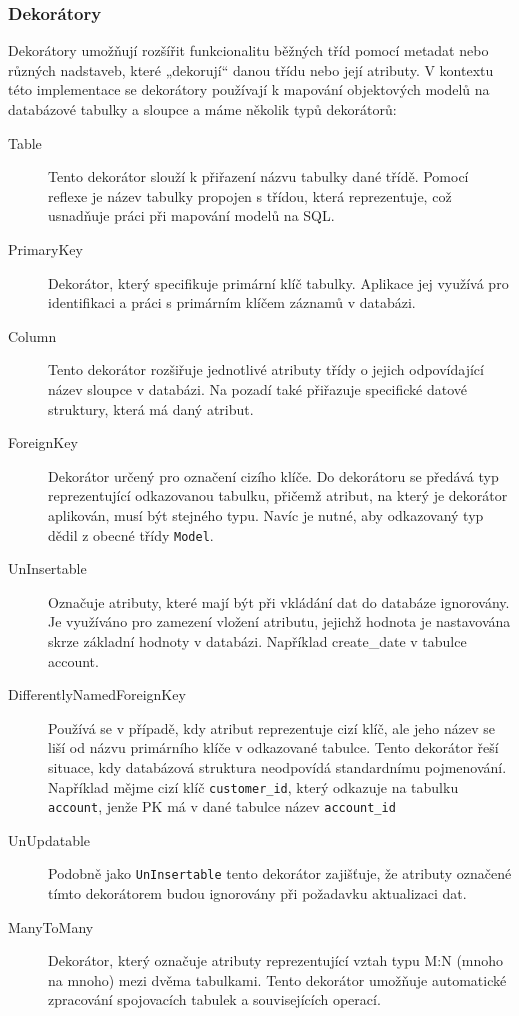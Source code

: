 \subsubsection{Dekorátory}
Dekorátory umožňují rozšířit funkcionalitu běžných tříd pomocí metadat nebo různých nadstaveb, které „dekorují“ danou třídu nebo její atributy\cite{TSDecorators}. V kontextu této implementace se dekorátory používají k mapování objektových modelů na databázové tabulky a sloupce a máme  několik typů dekorátorů:
\begin{description}
    \item[Table] 
    Tento dekorátor slouží k přiřazení názvu tabulky dané třídě. Pomocí reflexe je název tabulky propojen s třídou, která reprezentuje, což usnadňuje práci při mapování modelů na SQL.
    \item[PrimaryKey]  
Dekorátor, který specifikuje primární klíč tabulky. Aplikace jej využívá pro identifikaci a práci s primárním klíčem záznamů v databázi.

\item[Column] 
Tento dekorátor rozšiřuje jednotlivé atributy třídy o jejich odpovídající název sloupce v databázi. Na pozadí také přiřazuje specifické datové struktury, která má daný atribut.

\item[ForeignKey] 
Dekorátor určený pro označení cizího klíče. Do dekorátoru se předává typ reprezentující odkazovanou tabulku, přičemž atribut, na který je dekorátor aplikován, musí být stejného typu. Navíc je nutné, aby odkazovaný typ dědil z obecné třídy \texttt{Model}.

\item[UnInsertable]
Označuje atributy, které mají být při vkládání dat do databáze ignorovány. Je využíváno pro zamezení vložení atributu, jejichž hodnota je nastavována skrze základní hodnoty v databázi. Například create\_date v tabulce account.

\item[DifferentlyNamedForeignKey]  
Používá se v případě, kdy atribut reprezentuje cizí klíč, ale jeho název se liší od názvu primárního klíče v odkazované tabulce. Tento dekorátor řeší situace, kdy databázová struktura neodpovídá standardnímu pojmenování. Například mějme cizí klíč \texttt{customer\_id}, který odkazuje na tabulku \texttt{account}, jenže PK má v dané tabulce název \texttt{account\_id}

\item[UnUpdatable]  
Podobně jako \texttt{UnInsertable} tento dekorátor zajišťuje, že atributy označené tímto dekorátorem budou ignorovány při požadavku aktualizaci dat.

\item[ManyToMany]
Dekorátor, který označuje atributy reprezentující vztah typu M:N (mnoho na mnoho) mezi dvěma tabulkami. Tento dekorátor umožňuje automatické zpracování spojovacích tabulek a souvisejících operací.
\end{description}